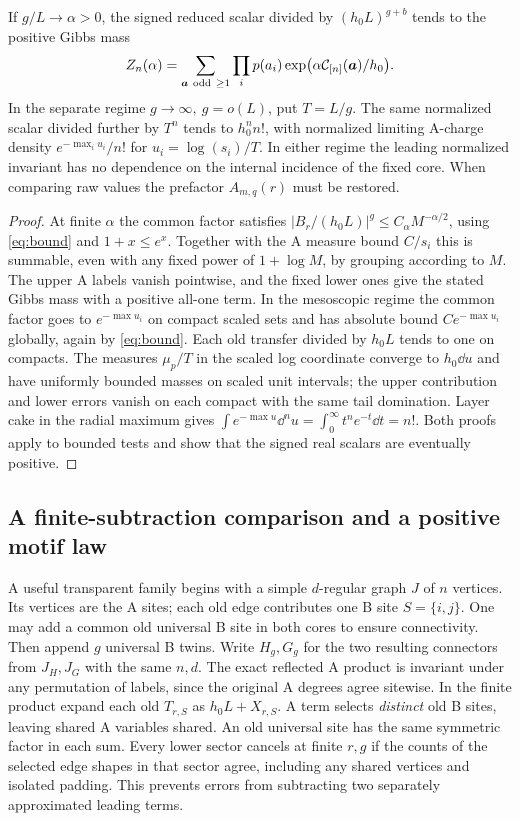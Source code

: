 \begin{proposition}\label{prop:thermal}
If \(g/L\to\alpha>0\), the signed reduced scalar divided by \((h_0L)^{g+b}\) tends to the positive Gibbs mass
\[
 Z_n(\alpha)=\sum_{\boldsymbol a\ {\rm odd}\ \ge1}
       \prod_i p(a_i)\exp\bigl(\alpha\mathcal C_{[n]}(\boldsymbol a)/h_0\bigr).
\]
In the separate regime \(g\to\infty,\ g=o(L)\), put \(T=L/g\). The same normalized scalar divided further by \(T^n\) tends to \(h_0^n n!\), with normalized limiting A-charge density \(e^{-\max_i u_i}/n!\) for \(u_i=\log(s_i)/T\). In either regime the leading normalized invariant has no dependence on the internal incidence of the fixed core. When comparing raw values the prefactor \(A_{m,q}(r)\) must be restored.
\end{proposition}
\begin{proof}
At finite \(\alpha\) the common factor satisfies
\(\lvert B_r/(h_0L)\rvert^g\le C_\alpha M^{-\alpha/2}\), using \eqref{eq:bound} and \(1+x\le e^x\). Together with the A measure bound \(C/s_i\) this is summable, even with any fixed power of \(1+\log M\), by grouping according to \(M\). The upper A labels vanish pointwise, and the fixed lower ones give the stated Gibbs mass with a positive all-one term. In the mesoscopic regime the common factor goes to \(e^{-\max u_i}\) on compact scaled sets and has absolute bound \(Ce^{-\max u_i}\) globally, again by \eqref{eq:bound}. Each old transfer divided by \(h_0L\) tends to one on compacts. The measures \(\mu_p/T\) in the scaled log coordinate converge to \(h_0\dd u\) and have uniformly bounded masses on scaled unit intervals; the upper contribution and lower errors vanish on each compact with the same tail domination. Layer cake in the radial maximum gives \(\int e^{-\max u}\dd^nu=\int_0^\infty t^n e^{-t}\dd t=n!\). Both proofs apply to bounded tests and show that the signed real scalars are eventually positive.
\end{proof}

\subsection{A finite-subtraction comparison and a positive motif law}
A useful transparent family begins with a simple \(d\)-regular graph \(J\) of \(n\) vertices. Its vertices are the A sites; each old edge contributes one B site \(S=\{i,j\}\). One may add a common old universal B site in both cores to ensure connectivity. Then append \(g\) universal B twins. Write \(H_g,G_g\) for the two resulting connectors from \(J_H,J_G\) with the same \(n,d\). The exact reflected A product is invariant under any permutation of labels, since the original A degrees agree sitewise. In the finite product expand each old \(T_{r,S}\) as \(h_0L+X_{r,S}\). A term selects \emph{distinct} old B sites, leaving shared A variables shared. An old universal site has the same symmetric factor in each sum. Every lower sector cancels at finite \(r,g\) if the counts of the selected edge shapes in that sector agree, including any shared vertices and isolated padding. This prevents errors from subtracting two separately approximated leading terms.

